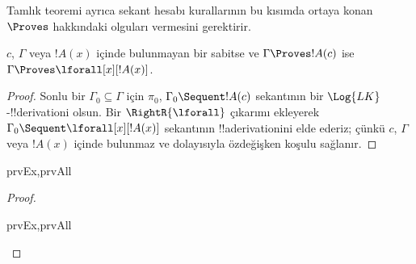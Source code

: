 \documentclass[../../../include/open-logic-section]{subfiles}
\begin{document}

\begin{explain}
  Tamlık teoremi ayrıca sekant hesabı kurallarının bu kısımda ortaya konan
  $\Proves$ hakkındaki olguları vermesini gerektirir.
\end{explain}

\begin{thm}
 $c$, $\Gamma$ veya $!A(x)$ içinde
bulunmayan bir sabitse ve $\Gamma\Proves !A(c)$ ise $\Gamma\Proves
\lforall[x][!A(x)]$.
\end{thm}

\begin{proof}
Sonlu bir $\Gamma_0\subseteq\Gamma$ için $\pi_0$, $\Gamma_0\Sequent !A(c)$
sekantının bir $\Log{LK}$-!!{derivation}{}i olsun. Bir $\RightR{\lforall}$
çıkarımı ekleyerek $\Gamma_0\Sequent\lforall[x][!A(x)]$ sekantının
!!a{derivation}{}ini elde ederiz; çünkü $c$, $\Gamma$ veya $!A(x)$ içinde
bulunmaz ve dolayısıyla özdeğişken koşulu sağlanır.
\end{proof}

\begin{prop}
\begin{tagenumerate}{prvEx,prvAll}
\end{tagenumerate}
\end{prop}

\begin{proof}
\begin{tagenumerate}{prvEx,prvAll}
\end{tagenumerate}
\end{proof}
\end{document}
